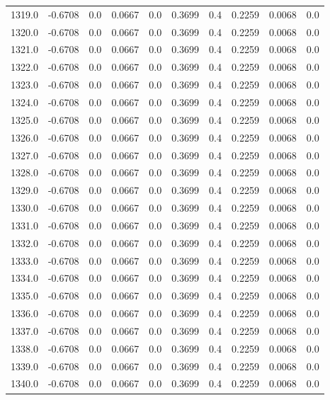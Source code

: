 \begin{longtable}{lrrrrrrrrr}
1319.0 & -0.6708 & 0.0 & 0.0667 & 0.0 & 0.3699 & 0.4 & 0.2259 & 0.0068 & 0.0 \\
1320.0 & -0.6708 & 0.0 & 0.0667 & 0.0 & 0.3699 & 0.4 & 0.2259 & 0.0068 & 0.0 \\
1321.0 & -0.6708 & 0.0 & 0.0667 & 0.0 & 0.3699 & 0.4 & 0.2259 & 0.0068 & 0.0 \\
1322.0 & -0.6708 & 0.0 & 0.0667 & 0.0 & 0.3699 & 0.4 & 0.2259 & 0.0068 & 0.0 \\
1323.0 & -0.6708 & 0.0 & 0.0667 & 0.0 & 0.3699 & 0.4 & 0.2259 & 0.0068 & 0.0 \\
1324.0 & -0.6708 & 0.0 & 0.0667 & 0.0 & 0.3699 & 0.4 & 0.2259 & 0.0068 & 0.0 \\
1325.0 & -0.6708 & 0.0 & 0.0667 & 0.0 & 0.3699 & 0.4 & 0.2259 & 0.0068 & 0.0 \\
1326.0 & -0.6708 & 0.0 & 0.0667 & 0.0 & 0.3699 & 0.4 & 0.2259 & 0.0068 & 0.0 \\
1327.0 & -0.6708 & 0.0 & 0.0667 & 0.0 & 0.3699 & 0.4 & 0.2259 & 0.0068 & 0.0 \\
1328.0 & -0.6708 & 0.0 & 0.0667 & 0.0 & 0.3699 & 0.4 & 0.2259 & 0.0068 & 0.0 \\
1329.0 & -0.6708 & 0.0 & 0.0667 & 0.0 & 0.3699 & 0.4 & 0.2259 & 0.0068 & 0.0 \\
1330.0 & -0.6708 & 0.0 & 0.0667 & 0.0 & 0.3699 & 0.4 & 0.2259 & 0.0068 & 0.0 \\
1331.0 & -0.6708 & 0.0 & 0.0667 & 0.0 & 0.3699 & 0.4 & 0.2259 & 0.0068 & 0.0 \\
1332.0 & -0.6708 & 0.0 & 0.0667 & 0.0 & 0.3699 & 0.4 & 0.2259 & 0.0068 & 0.0 \\
1333.0 & -0.6708 & 0.0 & 0.0667 & 0.0 & 0.3699 & 0.4 & 0.2259 & 0.0068 & 0.0 \\
1334.0 & -0.6708 & 0.0 & 0.0667 & 0.0 & 0.3699 & 0.4 & 0.2259 & 0.0068 & 0.0 \\
1335.0 & -0.6708 & 0.0 & 0.0667 & 0.0 & 0.3699 & 0.4 & 0.2259 & 0.0068 & 0.0 \\
1336.0 & -0.6708 & 0.0 & 0.0667 & 0.0 & 0.3699 & 0.4 & 0.2259 & 0.0068 & 0.0 \\
1337.0 & -0.6708 & 0.0 & 0.0667 & 0.0 & 0.3699 & 0.4 & 0.2259 & 0.0068 & 0.0 \\
1338.0 & -0.6708 & 0.0 & 0.0667 & 0.0 & 0.3699 & 0.4 & 0.2259 & 0.0068 & 0.0 \\
1339.0 & -0.6708 & 0.0 & 0.0667 & 0.0 & 0.3699 & 0.4 & 0.2259 & 0.0068 & 0.0 \\
1340.0 & -0.6708 & 0.0 & 0.0667 & 0.0 & 0.3699 & 0.4 & 0.2259 & 0.0068 & 0.0 \\

\end{longtable}

